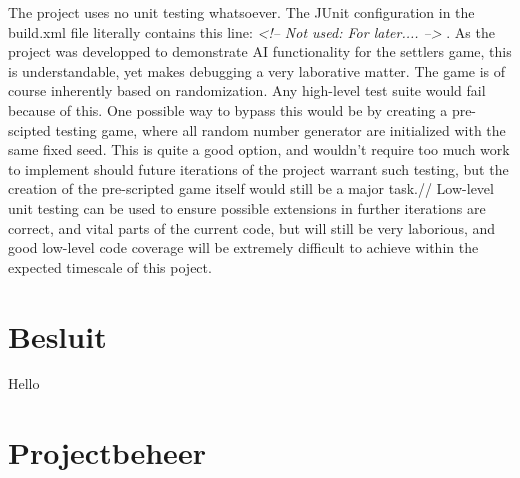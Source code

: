 \documentclass[pdftex12pt, a4paper]{article}
\begin{document}
The project uses no unit testing whatsoever. The JUnit configuration in the build.xml file literally contains this line:
\emph{<!-- Not used: For later.... -->} . As the project was developped to demonstrate AI functionality for the settlers game, this is understandable, yet makes debugging a very laborative matter.
The game is of course inherently based on randomization. Any high-level test suite would fail because of this. One possible way to bypass this would be by creating a pre-scipted testing game, where all random number generator are initialized with the same fixed seed.
This is quite a good option, and wouldn't require too much work to implement should future iterations of the project warrant such testing, but the creation of the pre-scripted game itself would still be a major task.//
Low-level unit testing can be used to ensure possible extensions in further iterations are correct, and vital parts of the current code, but will still be very laborious, and good low-level code coverage will be extremely difficult to achieve within the expected timescale of this poject.

\newpage

\section{Besluit}

Hello 


\newpage

\section{Projectbeheer}
\end{document}
